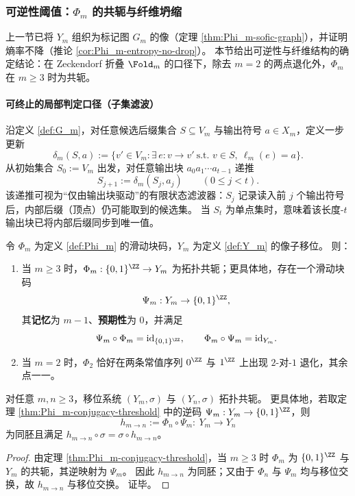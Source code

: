 \subsubsection{可逆性阈值：\texorpdfstring{$\Phi_m$}{Phi\_m} 的共轭与纤维坍缩}\label{subsec:Phi_m-conjugacy}

上一节已将 $Y_m$ 组织为标记图 $G_m$ 的像（定理 \ref{thm:Phi_m-sofic-graph}），并证明熵率不降（推论 \ref{cor:Phi_m-entropy-no-drop}）。
本节给出可逆性与纤维结构的确定结论：在 Zeckendorf 折叠 $\Fold_m$ 的口径下，除去 $m=2$ 的两点退化外，$\Phi_m$ 在 $m\ge 3$ 时为共轭。

\paragraph{可终止的局部判定口径（子集滤波）}
沿定义 \ref{def:G_m}，对任意候选后缀集合 $S\subseteq V_m$ 与输出符号 $a\in X_m$，定义一步更新
$$
\delta_m(S,a):=\{v'\in V_m:\exists\,e:v\to v'\ \text{s.t. }v\in S,\ \ell_m(e)=a\}.
$$
从初始集合 $S_0:=V_m$ 出发，对任意输出块 $a_0a_1\cdots a_{t-1}$ 递推
$$
S_{j+1}:=\delta_m(S_j,a_j)\qquad(0\le j<t).
$$
该递推可视为“仅由输出块驱动”的有限状态滤波器：$S_j$ 记录读入前 $j$ 个输出符号后，内部后缀（顶点）仍可能取到的候选集。
当 $S_t$ 为单点集时，意味着该长度-$t$ 输出块已将内部后缀同步到唯一值。

\begin{theorem}[可逆性阈值与有限窗逆码]\label{thm:Phi_m-conjugacy-threshold}
令 $\Phi_m$ 为定义 \ref{def:Phi_m} 的滑动块码，$Y_m$ 为定义 \ref{def:Y_m} 的像子移位。
则：
\begin{enumerate}
  \item 当 $m\ge 3$ 时，$\Phi_m:\{0,1\}^{\ZZ}\to Y_m$ 为拓扑共轭；更具体地，存在一个滑动块码
  $$
  \Psi_m:Y_m\to\{0,1\}^{\ZZ},
  $$
  其\textbf{记忆}为 $m-1$、\textbf{预期性}为 $0$，并满足
  $$
  \Psi_m\circ\Phi_m=\mathrm{id}_{\{0,1\}^{\ZZ}},\qquad
  \Phi_m\circ\Psi_m=\mathrm{id}_{Y_m}.
  $$
  \item 当 $m=2$ 时，$\Phi_2$ 恰好在两条常值序列 $0^{\ZZ}$ 与 $1^{\ZZ}$ 上出现 $2$-对-$1$ 退化，其余点一一。
\end{enumerate}
\end{theorem}

\begin{corollary}[像子移位的共轭类塌缩（\(m\ge 3\)）]\label{cor:Ym-conjugacy-all-mge3}
对任意 $m,n\ge 3$，移位系统 $(Y_m,\sigma)$ 与 $(Y_n,\sigma)$ 拓扑共轭。
更具体地，若取定理 \ref{thm:Phi_m-conjugacy-threshold} 中的逆码 $\Psi_m:Y_m\to\{0,1\}^{\ZZ}$，则
\[
h_{m\to n}:=\Phi_n\circ \Psi_m:\ Y_m\longrightarrow Y_n
\]
为同胚且满足 \(h_{m\to n}\circ\sigma=\sigma\circ h_{m\to n}\)。
\end{corollary}
\begin{proof}
由定理 \ref{thm:Phi_m-conjugacy-threshold}，当 \(m\ge 3\) 时 \(\Phi_m\) 为 \(\{0,1\}^{\ZZ}\) 与 \(Y_m\) 的共轭，其逆映射为 \(\Psi_m\)。
因此 \(h_{m\to n}\) 为同胚；又由于 \(\Phi_n\) 与 \(\Psi_m\) 均与移位交换，故 \(h_{m\to n}\) 与移位交换。
证毕。
\end{proof}


